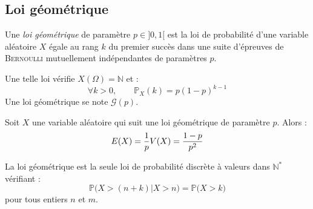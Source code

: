 \documentclass[11pt,a4paper,fleqn,pdftex]{report}
\begin{document}
\subsection{Loi géométrique}
\label{sub:loi_geometrique}
\begin{dfn}
     Une \emph{loi géométrique} de paramètre $p \in ]0, 1[$ est la loi de probabilité d'une variable aléatoire $X$ égale au rang $k$ du premier succès dans une suite d'épreuves de \textsc{Bernoulli} mutuellement indépendantes de paramètres $p$.\par
     Une telle loi vérifie $X(\Omega ) = \mathbb{N}$ et :
     \begin{equation}
     \forall k> 0,\qquad \mathbb{P}_X(k) = p (1-p)^{k-1}
     \end{equation}
     Une loi géométrique se note $\mathscr{G}(p)$.
\end{dfn}
\begin{theorem}
     Soit $X$ une variable aléatoire qui suit une loi géométrique de paramètre $p$. Alors : 
     \begin{equation}
     E(X) = \dfrac{1}{p} \\ V(X) = \dfrac{1-p}{p^2}
     \end{equation}
\end{theorem}
\begin{itheorem}
     La loi géométrique est la seule loi de probabilité discrète à valeurs dans $\mathbb{N}^*$ vérifiant : 
     \begin{equation}
     \mathbb{P}\Big( X > (n+k) \Big| X > n \Big) = \mathbb{P} \big( X > k \big)
     \end{equation}
     pour tous entiers $n$ et $m$.
\end{itheorem}
\end{document}

